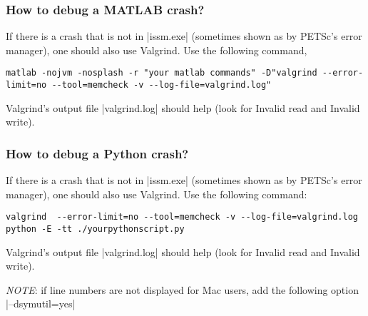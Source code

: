 \subsubsection{How to debug a MATLAB crash?}
If there is a crash that is not in \lstinlinebg|issm.exe| (sometimes shown as by PETSc's error manager), one should also use Valgrind. Use the following command,
\begin{lstlisting}
matlab -nojvm -nosplash -r "your matlab commands" -D"valgrind --error-limit=no --tool=memcheck -v --log-file=valgrind.log"
\end{lstlisting}
Valgrind's output file \lstinlinebg|valgrind.log| should help (look for Invalid read and Invalid write).

\subsubsection{How to debug a Python crash?}
If there is a crash that is not in \lstinlinebg|issm.exe| (sometimes shown as by PETSc's error manager), one should also use Valgrind. Use the following command:
\begin{lstlisting}
valgrind  --error-limit=no --tool=memcheck -v --log-file=valgrind.log python -E -tt ./yourpythonscript.py
\end{lstlisting}
Valgrind's output file \lstinlinebg|valgrind.log| should help (look for Invalid read and Invalid write).

\emph{NOTE}: if line numbers are not displayed for Mac users, add the following option \lstinlinebg|--dsymutil=yes|

\clearpage %
